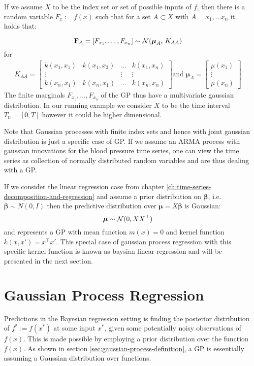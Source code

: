 If we assume $X$ to be the index set or set of possible inputs of $f$, then there is a random variable
$F_x := f(x)$ such that for a set $A \subset X$ with $A={x_1, \dots x_n}$ it holds that:

\[\mathbf{F}_A = [F_{x_1}, \dots , F_{x_n}] \sim \operatorname{\mathcal{N}}(\boldsymbol{\mu}_A,\,K_{AA})\]
for
\begin{gather}\label{def:Kernel-Matrix}
    K_{AA} =
    \begin{bmatrix}
        k(x_1, x_1) & k(x_1, x_2) & \dots & k(x_1, x_n)\\
        \vdots  &  & \vdots  & \vdots \\
        k(x_n, x_1)  & k(x_n, x_1) & \dots  & k(x_n, x_n)
    \end{bmatrix} \text{and }
    \boldsymbol{\mu}_A =
    \begin{bmatrix}
        \mu(x_1) \\
        \vdots \\
        \mu(x_n)
    \end{bmatrix}
\end{gather}
The finite marginals $F_{x_1}, \dots, F_{x_n}$ of the GP thus have a multivariate gaussian distribution.
In our running example we consider $X$ to be the time interval $T_0=[0, T]$ however it could be higher dimensional.

Note that Gaussian processes with finite index sets and hence with joint gaussian distribution is just a specific case
of GP. If we assume an ARMA process with gaussian innovations for the blood pressure time series, one can view the time series
as collection of normally distributed random variables and are thus dealing with a GP.


If we consider the linear regression case from chapter \ref{ch:time-series-decomposition-and-regression} and assume a
prior distribution
on $\boldsymbol{\beta}$, i.e. $\boldsymbol{\beta} \sim N(0, I)$ then the predictive distribution over $\boldsymbol{\mu} = X \boldsymbol{\beta}$ is Gaussian:
\[
    \boldsymbol{\mu} \sim \operatorname{\mathcal{N}}(0, XX^{\top})
\]
and represents a GP with mean function $m(x) = 0$ and kernel function $k(x, x') = x^{\top}x'$.
This special case of gaussian process regression with this specific kernel function is known as baysian linear regression
and will be presented in the next section.


\section{Gaussian Process Regression}
Predictions in the Bayesian regression setting is finding the posterior distribution of
$f^{\ast} := f(x^{\ast})$ at some input $x^{\ast}$, given some potentially noisy observations of $f(x)$.
This is made possible by employing a prior distribution
over the function $f(x)$. As shown in section \ref{sec:gaussian-process-definition}, a GP is essentially
assuming a Gaussian distribution over functions.


